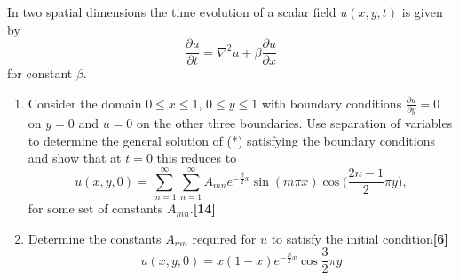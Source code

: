 \documentclass[a4paper]{article}
\begin{document}
\newpage
\begin{qns}
In two spatial dimensions the time evolution of a scalar field $u(x, y, t)$ is given by
\begin{equation}
\frac{\partial u}{\partial t}=\nabla^2u+\beta\frac{\partial u}{\partial x}\tag{*}
\end{equation}
for constant $\beta$.
\begin{enumerate}[label=(\alph*)]
    \item Consider the domain $0\leq x\leq 1$, $0\leq y\leq 1$ with boundary conditions $\frac{\partial u}{\partial y}=0$ on $y = 0$ and $u = 0$ on the other three boundaries. Use separation of variables to determine the general solution of (*) satisfying the boundary conditions and show that at $t = 0$ this reduces to
$$u(x,y,0)=\sum_{m=1}^\infty\sum_{n=1}^\infty A_{mn}e^{-\frac{\beta}{2}x}
\sin(m\pi x)\cos\bigg(\frac{2n-1}{2}\pi y\bigg),$$ 
for some set of constants $A_{mn}$.\hfill \textbf{[14]}
\item Determine the constants $A_{mn}$ required for $u$ to satisfy the initial condition\hfill \textbf{[6]}
$$u(x,y,0)=x(1-x)e^{-\frac{\beta}{2}x}\cos\frac{3}{2}\pi y$$
\end{enumerate}
\end{qns}
\end{document}

